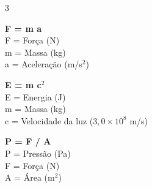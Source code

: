 \documentclass[a4paper,landscape]{article}
\begin{document}
\begin{multicols}{3}

\textbf{F = m a} \\
F = Força (N) \\
m = Massa (kg) \\
a = Aceleração (m/s$^2$) \\
\vspace{1em}

\textbf{E = m c$^2$} \\
E = Energia (J) \\
m = Massa (kg) \\
c = Velocidade da luz ($3{,}0 \times 10^8$ m/s) \\
\vspace{1em}

\textbf{P = F / A} \\
P = Pressão (Pa) \\
F = Força (N) \\
A = Área (m$^2$) \\
\vspace{1em}

\end{multicols}
\end{document}
